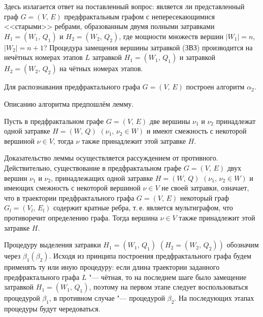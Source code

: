Здесь излагается ответ на поставленный вопрос: является ли представленный граф  $G=(V,\,E)$ предфрактальным графом с
непересекающимися <<старыми>> ребрами, образованным двумя полными затравками $H_1 =(W_1,\,Q_1 )$ и $H_2 =(W_2,\,Q_2)$, где
мощности множеств вершин $|W_1|=n$, $|W_2|=n+1$? Процедура замещения вершины затравкой (ЗВЗ) \cite{utakaeva:bib2} производится на
нечётных номерах этапов $L$ затравкой $H_1 =(W_1,\,Q_1)$ и затравкой $H_2 =(W_2,\,Q_2)$ на чётных номерах этапов.

Для распознавания предфрактального графа $G=(V,\,E)$ построен алгоритм $\alpha _2$.

Описанию алгоритма предпошлём лемму.

\smallskip

\begin{lemma}
Пусть в предфрактальном графе $G=(V,\,E)$ две вершины $\nu_1$ и $\nu_2$ принадлежат одной затравке $H=(W,\,Q)$ $(\nu_1,\,\nu_2
\in W)$ и имеют смежность с некоторой вершиной $\nu \in V$, тогда $\nu$ также принадлежит этой затравке $H$.
\end{lemma}

\smallskip

Доказательство леммы осуществляется рассуждением от противного. Действительно, существование в предфрактальном графе $G=(V,\,E)$
двух вершин $\nu_1$ и $\nu_2$, принадлежащих одной затравке $H=(W,\,Q)$ $(\nu_1,\,\nu_2 \in W)$ и имеющих смежность с некоторой
вершиной $\nu \in V$ не своей затравки, означает, что в траектории предфрактального графа $G=(V,\,E)$ некоторый граф
$G_l=(V_l,\,E_l)$ содержит кратные ребра, т.\,е. является мультиграфом, что противоречит определению графа. Тогда вершина $\nu
\in V$ также принадлежит этой затравке $H$.

\smallskip

 Процедуру выделения затравки $H_1 =(W_1,\,Q_1)$ $(H_2 =(W_2,\,Q_2))$ обозначим через $\beta_1
(\beta_2)$. Исходя из принципа построения предфрактального графа будем применять ту или иную процедуру: если длина траектории
заданного предфрактального графа $L$ "--- чётная, то на последнем шаге было замещение затравкой $H_1 =(W_1,\,Q_1)$, поэтому на
первом этапе следует воспользоваться процедурой $\beta_1$, в противном случае "--- процедурой $\beta_2$. На последующих этапах
процедуры будут чередоваться.

\smallskip

